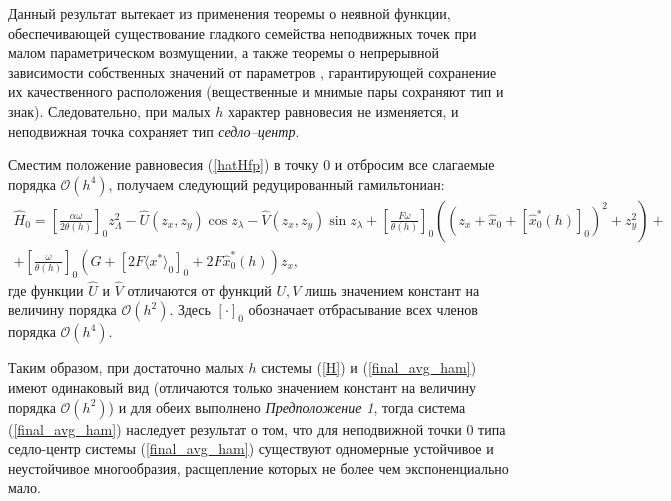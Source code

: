 Данный результат вытекает из применения теоремы о неявной функции, обеспечивающей существование гладкого семейства неподвижных точек при малом параметрическом возмущении, а также теоремы о непрерывной зависимости собственных значений от параметров \cite{arnold,horn}, гарантирующей сохранение их качественного расположения (вещественные и мнимые пары сохраняют тип и знак). 
Следовательно, при малых $h$ характер равновесия не изменяется, и неподвижная точка сохраняет тип \textit{седло–центр}.

Сместим положение равновесия (\ref{hatHfp}) в точку 0 и отбросим все слагаемые порядка $\mathcal{O}(h^4)$, получаем следующий редуцированный гамильтониан: 
\begin{multline}
\hat H_0 = \left[ \frac{\alpha \omega}{2 \theta(h)} \right]_0 z_\Lambda^2 - \hat U(z_x,z_y)\cos{z_\lambda} - \hat V(z_x,z_y)\sin{z_\lambda} + \left[ \frac{F \omega}{\theta(h)} \right]_0 \left((z_x+\hat x_0 + \left[ \hat x_0^*(h) \right]_0 )^2+z_y^2 \right) + \\ + \left[ \frac{\omega}{\theta(h)} \right]_0 \left( G + \left[ 2F \langle x^* \rangle_0 \right]_0 + 2F \hat x_0^*(h) \right) z_x ,
\label{final_avg_ham}
\end{multline}
где функции $\hat U$ и $\hat V$ отличаются от функций $U, V$ лишь значением констант на величину порядка $\mathcal{O}(h^2)$.
Здесь $[ \cdot ]_0$ обозначает отбрасывание всех членов порядка $\mathcal{O}(h^4)$.

Таким образом, при достаточно малых $h$ системы (\ref{H}) и (\ref{final_avg_ham}) имеют одинаковый вид (отличаются только значением констант на величину порядка $\mathcal{O}(h^2)$) и для обеих выполнено \textit{Предположение 1}, тогда система (\ref{final_avg_ham}) наследует результат о том, что для неподвижной точки $0$ типа седло-центр системы (\ref{final_avg_ham}) существуют одномерные устойчивое и неустойчивое многообразия, расщепление которых не более чем экспоненциально мало.
